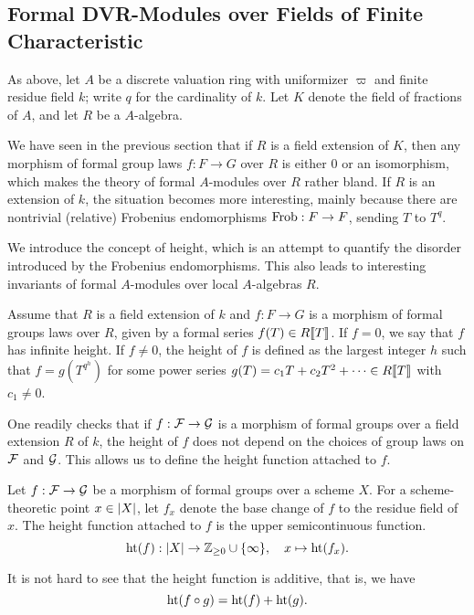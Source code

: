 \documentclass[../main.tex]{subfiles}
\begin{document}
\subsection{Formal DVR-Modules over Fields of Finite Characteristic} %
\label{sub:Formal DVR-Modules over Fields}
As above, let $A$ be a discrete valuation ring with uniformizer $\varpi$ and finite 
residue field $k$; write $q$ for the cardinality of $k$. Let $K$ denote the
field of fractions of $A$, and let $R$ be a $A$-algebra. 

We have seen in the previous section that if $R$ is a field extension of $K$,
then any morphism of formal group laws $f: F \to G$ over $R$ is either $0$
or an isomorphism, which makes the theory of formal $A$-modules over $R$ rather
bland. If $R$ is an extension of $k$, the situation becomes more interesting,
mainly because there are nontrivial (relative) Frobenius endomorphisms $\mathrm{Frob}: F \to F$, sending $T$ to $T^q$. 

We introduce the concept of height, which is an attempt to quantify the disorder
introduced by the Frobenius endomorphisms. This also leads to interesting
invariants of formal $A$-modules over local $A$-algebras $R$.

\begin{defi}
  Assume that $R$ is a field extension of $k$ and $f: F \to G$ is a morphism of 
  formal groups laws over $R$, given by a formal series $f(T) \in R\llbracket T \rrbracket$. 
  If $f = 0$, we say that $f$ has infinite height. 
  If $f \neq 0$, the height of $f$ is defined as the largest integer $h$ such that 
  $f = g(T^{q^h})$ for some power series $g(T) = c_1 T + c_2 T^2 + \dots \in
  R\llbracket T \rrbracket$ with $c_1 \neq 0$. 
\end{defi}
One readily checks that if $f: \mathcal{F} \to \mathcal{G}$ is a morphism of formal groups over
a field extension $R$ of $k$, the height of $f$ does not depend on the choices
of group laws on $\mathcal{F}$ and $\mathcal{G}$. This allows us to define the height function 
attached to $f$. 
\begin{defi}
  Let $f: \mathcal{F} \to \mathcal{G}$ be a morphism of formal groups over a scheme $X$.
  For a scheme-theoretic point $x \in \lvert X \rvert$, let $f_x$ denote the base change of $f$ to the residue field of $x$. 
  The height function attached to $f$ is the upper semicontinuous function.
  \begin{equation} \label{eq:defheight}
    \textnormal{ht}(f) : \lvert X \rvert \to \mathbb{Z}_{\geq 0} \cup \{\infty\}, \quad x \mapsto 
    \textnormal{ht}(f_x).
  \end{equation}
\end{defi}
It is not hard to see that the height function is additive, that is, we have
\begin{equation*}
  \textnormal{ht}(f \circ g) = \textnormal{ht}(f) + \textnormal{ht}(g).
\end{equation*}
\end{document}
